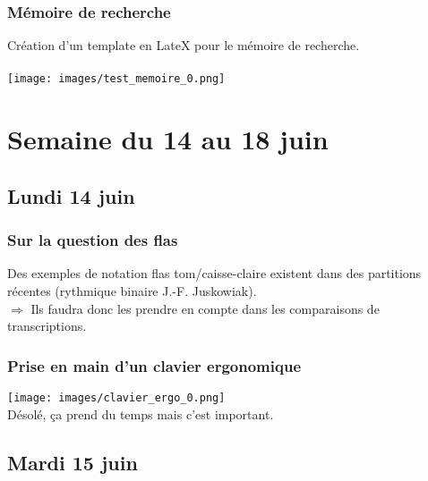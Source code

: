\documentclass{report}
\begin{document}
\subsection{Mémoire de recherche}
Création d’un template en LateX pour le mémoire de recherche.\\\\
\texttt{[image: images/test\_memoire\_0.png]}\\

\newpage
	\chapter{Semaine du 14 au 18 juin}
	\section{Lundi 14 juin}
	\subsection{Sur la question des flas}
	Des exemples de notation flas tom/caisse-claire existent dans des partitions récentes (rythmique binaire J.-F. Juskowiak).\\
	$\Rightarrow$ Ils faudra donc les prendre en compte dans les comparaisons de transcriptions.
	\subsection{Prise en main d’un clavier ergonomique}
	\texttt{[image: images/clavier\_ergo\_0.png]}\\
	Désolé, ça prend du temps mais c’est important.
	\newpage
	\section{Mardi 15 juin}
\end{document}
